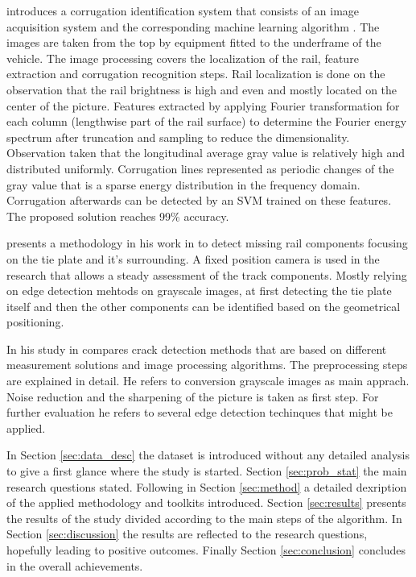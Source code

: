 \documentclass[10pt, final]{article}
\begin{document}
		\citeauthor{li_cyber-enabled_2018} introduces a corrugation identification system that consists of an image
		acquisition system and the corresponding machine learning algorithm \cite{li_cyber-enabled_2018}.
		The images are taken from the top by equipment fitted to the underframe of the vehicle.
		The image processing covers the localization of the rail, feature extraction and corrugation recognition steps.
		Rail localization is done on the observation that the rail brightness is high and even and mostly located on the
		center of the picture.
		Features extracted by applying Fourier transformation for each column (lengthwise part of the rail surface) to 
		determine the Fourier energy spectrum after truncation and sampling to reduce the dimensionality.
		Observation taken that the longitudinal average gray value is relatively high and distributed uniformly.
		Corrugation lines represented as periodic changes of the gray value that is a sparse energy distribution
		in the frequency domain.
		Corrugation afterwards can be detected by an SVM trained on these features.
		The proposed solution reaches 99\% accuracy.
		

		\citeauthor{li_component-based_2011} presents a methodology \cite{li_component-based_2011} 
		in his work in 
		to detect missing rail components focusing on the tie plate and it's surrounding.
		A fixed position camera is used in the research that allows a steady assessment of the track components.
		Mostly relying on edge detection mehtods on grayscale images, 
		at first detecting the tie plate itself and then the other components can be identified 
		based on the geometrical positioning.

		In his study \citeauthor{kumar_m_survey_2018} in  compares crack detection 
		methods that are based on different measurement solutions and image processing algorithms.
		The preprocessing steps are explained in detail.
		He refers to conversion grayscale images as main apprach.
		Noise reduction and the sharpening of the picture is taken as first step.
		For further evaluation he refers to several edge detection techinques that might be applied.

		In Section \ref{sec:data_desc} the dataset is introduced without any detailed analysis
		to give a first glance where the study is started. 
		Section \ref{sec:prob_stat} the main research questions stated. 
		Following in Section \ref{sec:method} a detailed dexription of the applied methodology
		and toolkits introduced.
		Section \ref{sec:results} presents the results of the study divided according to 
		the main steps of the algorithm.
		In Section \ref{sec:discussion} the results are reflected to the research questions, 
		hopefully leading to positive outcomes.
		Finally Section \ref{sec:conclusion} concludes in the overall achievements.
\end{document}
